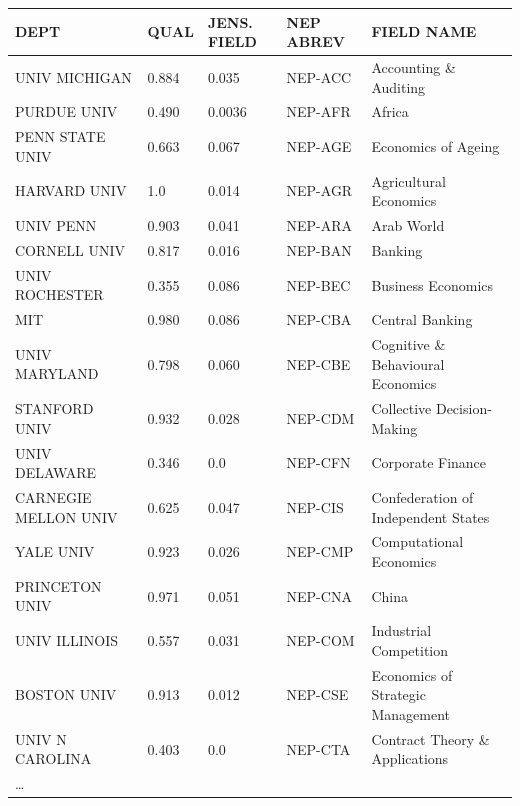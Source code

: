 \documentclass[]{article}
\begin{document}
\begin{table}
    \centering
    \begin{tabular}{lllll}
        DEPT                     & QUAL  & JENS. FIELD & NEP ABREV & FIELD NAME\\ \hline
        UNIV MICHIGAN            & 0.884 & 0.035       & NEP-ACC   & Accounting \& Auditing\\
        PURDUE UNIV              & 0.490 & 0.0036      & NEP-AFR   & Africa\\
        PENN STATE UNIV          & 0.663 & 0.067       & NEP-AGE   & Economics of Ageing\\
        HARVARD UNIV             & 1.0   & 0.014       & NEP-AGR   & Agricultural Economics\\
        UNIV PENN                & 0.903 & 0.041       & NEP-ARA   & Arab World\\
        CORNELL UNIV             & 0.817 & 0.016       & NEP-BAN   & Banking\\
        UNIV ROCHESTER           & 0.355 & 0.086       & NEP-BEC   & Business Economics\\
        MIT                      & 0.980 & 0.086       & NEP-CBA   & Central Banking\\
        UNIV MARYLAND            & 0.798 & 0.060       & NEP-CBE   & Cognitive \& Behavioural Economics\\
        STANFORD UNIV            & 0.932 & 0.028       & NEP-CDM   & Collective Decision-Making\\
        UNIV DELAWARE            & 0.346 & 0.0         & NEP-CFN   & Corporate Finance\\
        CARNEGIE MELLON UNIV     & 0.625 & 0.047       & NEP-CIS   & Confederation of Independent States\\
        YALE UNIV                & 0.923 & 0.026       & NEP-CMP   & Computational Economics\\
        PRINCETON UNIV           & 0.971 & 0.051       & NEP-CNA   & China\\
        UNIV ILLINOIS            & 0.557 & 0.031       & NEP-COM   & Industrial Competition\\
        BOSTON UNIV              & 0.913 & 0.012       & NEP-CSE   & Economics of Strategic Management\\
        UNIV N CAROLINA          & 0.403 & 0.0         & NEP-CTA   & Contract Theory \& Applications\\
        \ldots                   &       &             &           &\\

\end{tabular}
\end{table}
\end{document}
